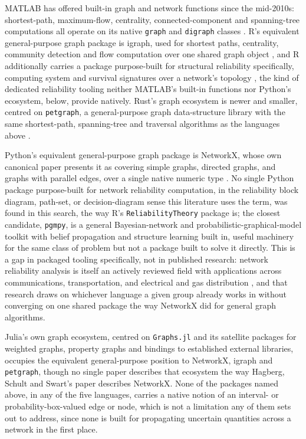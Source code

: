 \documentclass[12pt]{report}
\begin{document}
{MATLAB} has offered built-in graph and network functions since the mid-2010s: shortest-path,
maximum-flow, centrality, connected-component and spanning-tree computations all operate on its
native \texttt{graph} and \texttt{digraph} classes \cite{mathworks_graphalgorithms}. R's
equivalent general-purpose graph package is igraph, used for shortest paths, centrality,
community detection and flow computation over one shared graph object \cite{csardi2006igraph},
and R additionally carries a package purpose-built for structural reliability specifically,
computing system and survival signatures over a network's topology \cite{aslett_reliabilitytheory},
the kind of dedicated reliability tooling neither {MATLAB}'s built-in functions nor Python's
ecosystem, below, provide natively. Rust's graph ecosystem is newer and smaller, centred on
\texttt{petgraph}, a general-purpose graph data-structure library with the same shortest-path,
spanning-tree and traversal algorithms as the languages above \cite{petgraph}.

Python's equivalent general-purpose graph package is NetworkX, whose own canonical paper
presents it as covering simple graphs, directed graphs, and graphs with parallel edges, over a
single native numeric type \cite{hagberg2008networkx}. No single Python package purpose-built for
network reliability computation, in the reliability block diagram, path-set, or decision-diagram
sense this literature uses the term, was found in this search, the way R's
\texttt{ReliabilityTheory} package is; the closest candidate, \texttt{pgmpy}, is a general
Bayesian-network and probabilistic-graphical-model toolkit with belief propagation and structure
learning built in, useful machinery for the same class of problem but not a package built to
solve it directly. This is a gap in packaged tooling specifically, not in published research:
network reliability analysis is itself an actively reviewed field with applications across
communications, transportation, and electrical and gas distribution \cite{gaur2021literature},
and that research draws on whichever language a given group already works in without converging
on one shared package the way NetworkX did for general graph algorithms.

Julia's own graph ecosystem, centred on \texttt{Graphs.jl} and its satellite packages for
weighted graphs, property graphs and bindings to established external libraries, occupies the
equivalent general-purpose position to NetworkX, igraph and \texttt{petgraph}, though no single
paper describes that ecosystem the way Hagberg, Schult and Swart's paper describes NetworkX.
None of the packages named above, in any of the five languages, carries a native notion of an
interval- or probability-box-valued edge or node, which is not a limitation any of them sets out
to address, since none is built for propagating uncertain quantities across a network in the
first place.
\end{document}
